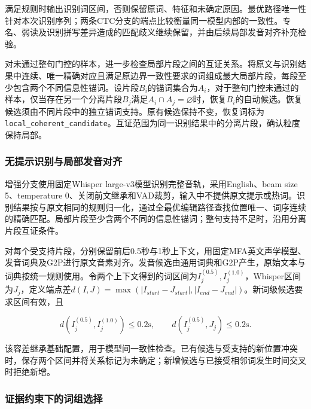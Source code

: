 满足规则时输出识别词区间，否则保留原词、特征和未确定原因。最优路径唯一性针对本次识别序列；两条CTC分支的端点比较衡量同一模型内部的一致性。专名、弱读及识别拼写差异造成的匹配歧义继续保留，并由后续局部发音对齐补充检验。

对未通过整句门控的样本，进一步检查局部片段之间的互证关系。将原文与识别结果中连续、唯一精确对应且满足原边界一致性要求的词组成最大局部片段，每段至少包含两个不同信息性锚词。设片段\(B_i\)的锚词集合为\(A_i\)，对于整句门控未通过的样本，仅当存在另一个分离片段\(B_j\)满足\(A_i\cap A_j=\varnothing\)时，恢复\(B_i\)的自动候选。恢复候选须由不同片段中的独立锚词支持。原有候选保持不变，恢复词标为\texttt{local\_\allowbreak{}coherent\allowbreak{}\_\allowbreak{}candidat\allowbreak{}e}。互证范围为同一识别结果中的分离片段，确认粒度保持局部。

\hypertarget{q1-ux65e0ux63d0ux793aux8bc6ux522bux4e0eux5c40ux90e8ux53d1ux97f3ux5bf9ux9f50}{%
\subsubsection{无提示识别与局部发音对齐}\label{q1-ux65e0ux63d0ux793aux8bc6ux522bux4e0eux5c40ux90e8ux53d1ux97f3ux5bf9ux9f50}}

增强分支使用固定Whisper large-v3\cite{q1-ref5}模型识别完整音轨，采用English、beam size 5、temperature 0、关闭前文继承和VAD裁剪，输入中不提供原文提示或热词。识别结果按与原文相同的规则归一化，通过全最优编辑路径查找位置唯一、词序连续的精确匹配。局部片段至少含两个不同的信息性锚词；整句支持不足时，沿用分离片段互证条件。

对每个受支持片段，分别保留前后0.5秒与1秒上下文，用固定MFA\cite{q1-ref6}英文声学模型、发音词典及G2P进行原文音素对齐。发音候选由通用词典和G2P产生，原始文本与词典按统一规则使用。令两个上下文得到的词区间为\(I_j^{(0.5)},I_j^{(1.0)}\)，Whisper区间为\(J_j\)，定义端点差\(d(I,J)=\max(|I_{start}-J_{start}|,|I_{end}-J_{end}|)\)。新词级候选要求区间有效，且

\begin{equation}d(I_j^{(0.5)},I_j^{(1.0)})\le0.2\mathrm{s},\qquad d(I_j^{(0.5)},J_j)\le0.2\mathrm{s}.\end{equation}

该容差继承基础配置，用于模型间一致性检查。已有候选与受支持的新位置冲突时，保存两个区间并将关系标记为未确定；新增候选与已接受相邻词发生时间交叉时拒绝新增。

\hypertarget{q1-ux8bc1ux636eux7ea6ux675fux4e0bux7684ux8bcdux7ec4ux9009ux62e9}{%
\subsubsection{证据约束下的词组选择}\label{q1-ux8bc1ux636eux7ea6ux675fux4e0bux7684ux8bcdux7ec4ux9009ux62e9}}

